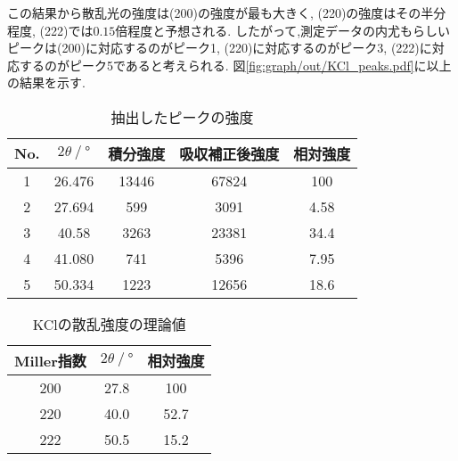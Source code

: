 この結果から散乱光の強度は(200)の強度が最も大きく, (220)の強度はその半分程度, (222)では$0.15$倍程度と予想される.
したがって,測定データの内尤もらしいピークは(200)に対応するのがピーク1,
(220)に対応するのがピーク3,
(222)に対応するのがピーク5であると考えられる.
図\ref{fig:graph/out/KCl_peaks.pdf}に以上の結果を示す.
\begin{table}[h]
\caption{抽出したピークの強度}
\label{tab:extract_peak_i}
\centering
\begin{tabular}{ccccc}
\hline
No.&$2\theta\ /\ \si{\degree}$&積分強度&吸収補正後強度&相対強度\\
\hline \hline
1&26.476& 13446 & 67824 & 100   \\
2&27.694& 599   & 3091  & 4.58  \\
3&40.58 & 3263  & 23381 & 34.4  \\
4&41.080& 741   & 5396  & 7.95  \\
5&50.334& 1223  & 12656 & 18.6  \\
\hline
\end{tabular}
\end{table}
\begin{table}[h]
\caption{KClの散乱強度の理論値}
\label{tab:KCl_i_riron}
\centering
\begin{tabular}{ccc}
\hline
Miller指数&$2\theta\ /\ \si{\degree}$&相対強度\\
\hline \hline
200&27.8&100\\
220&40.0&52.7\\
222&50.5&15.2\\
\hline
\end{tabular}
\end{table}

